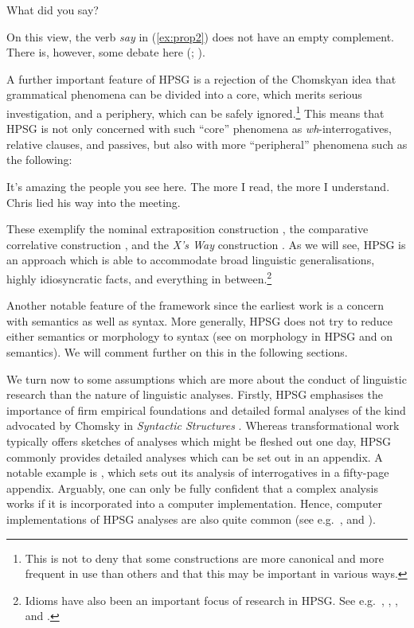 \documentclass[output=paper,biblatex,babelshorthands,newtxmath,draftmode,colorlinks,citecolor=brown]{langscibook}
\begin{document}
\ea\label{ex:prop2}
What did you say?
\z

\noindent
On this view, the verb \emph{say} in (\ref{ex:prop2}) does not have an empty complement. There is,
however, some debate here (\citealp{SF94a,Mueller2004e};
).

\largerpage[1.5]
A further important feature of HPSG is a rejection of the Chomskyan idea that grammatical phenomena
can be divided into a core, which merits serious investigation, and a periphery, which can be safely
ignored.\footnote{%
  This is not to deny that some constructions are more canonical and more frequent in use than
  others and that this may be important in various ways.} 
%
This means that HPSG is not only concerned with such ``core'' phenomena as \emph{wh}-interrogatives,
relative clauses, and passives, but also with more ``peripheral'' phenomena such as the following: 


\eal\label{ex:prop3}
\ex\label{ex:prop3a}
It’s amazing the people you see here.
\ex\label{ex:prop3b}
The more I read, the more I understand.
\ex\label{ex:prop3c}
Chris lied his way into the meeting.
\zl

\noindent
These exemplify the nominal extraposition construction \citep{ML96a}, the comparative correlative
construction \citep{Abeille2006a,AB2008a-u,Borsley2011a-u}, and the \emph{X’s Way} construction
\citep[Section~7.4]{Sag2012a}. As we will see, HPSG is an approach which is able to accommodate
broad linguistic generalisations, highly idiosyncratic facts, and everything in between.\footnote{%
  Idioms have also been an important focus of research in HPSG. See e.g.\
  , , , and
  \crossrefchaptert{idioms}.} 
%

Another notable feature of the framework since the earliest work is a concern with semantics as well
as syntax. More generally, HPSG does not try to reduce either semantics or morphology to syntax (see
\crossrefchapteralt{morphology} on morphology in HPSG and \crossrefchapteralt{semantics} on
semantics). We will comment further on this in the following sections. 

\largerpage[1.5]
We turn now to some assumptions which are more about the conduct of linguistic research than the
nature of linguistic analyses. Firstly, HPSG emphasises the importance of firm empirical foundations
and detailed formal analyses of the kind advocated by Chomsky in \emph{Syntactic Structures}
\citep[\page 5]{Chomsky57a}. Whereas transformational work typically offers sketches of analyses
which might be fleshed out one day, HPSG commonly provides detailed analyses which can be set out in
an appendix. A notable example is \citet{GSag2000a-u}, which sets out its analysis of \ili{English}
interrogatives in a fifty-page appendix. Arguably, one can only be fully confident that a complex
analysis works if it is incorporated into a computer implementation. Hence, computer implementations
of HPSG analyses are also quite common (see e.g.\
\citealp{Babel,MuellerCoreGram,Copestake2002a,BDFPS2010a-u,Bender2016}, and
\crossrefchapteralp{cl}). 
\end{document}
